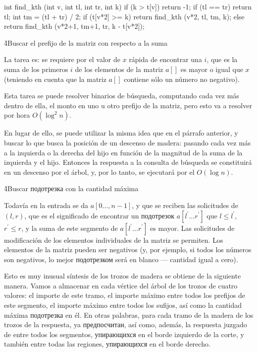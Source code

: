 \code
int find_kth (int v, int tl, int tr, int k) {
if (k > t[v])
return -1;
if (tl == tr)
return tl;
int tm = (tl + tr) / 2;
if (t[v*2] >= k)
return find_kth (v*2, tl, tm, k);
else
return find_kth (v*2+1, tm+1, tr, k - t[v*2]);
}
\endcode

\h4{Buscar el prefijo de la matriz con respecto a la suma}

La tarea es: se requiere por el valor de $x$ rápida de encontrar una $i$, que es la suma de los primeros $i$ de los elementos de la matriz $a[]$ es mayor o igual que $x$ (teniendo en cuenta que la matriz $a[]$ contiene sólo un número no negativo).

Esta tarea se puede resolver binarios de búsqueda, computando cada vez más dentro de ella, el monto en uno u otro prefijo de la matriz, pero esto va a resolver por hora $O (\log^2 n)$.

En lugar de ello, se puede utilizar la misma idea que en el párrafo anterior, y buscar lo que busca la posición de un descenso de madera: pasando cada vez más a la izquierda o la derecha del hijo en función de la magnitud de la suma de la izquierda y el hijo. Entonces la respuesta a la consulta de búsqueda se constituirá en un descenso por el árbol, y, por lo tanto, se ejecutará por el $O (\log n)$.

\h4{Buscar подотрезка con la cantidad máxima}

Todavía en la entrada se da $a[0 \ldots, n-1]$, y que se reciben las solicitudes de $(l,r)$, que es el significado de encontrar un подотрезок $a[l^\prime \ldots r^\prime]$ que $l \le l^\prime$, $r^\prime \le r$, y la suma de este segmento de $a[l^\prime \ldots r^\prime]$ es mayor. Las solicitudes de modificación de los elementos individuales de la matriz se permiten. Los elementos de la matriz pueden ser negativos (y, por ejemplo, si todos los números son negativos, lo mejor подотрезком será en blanco --- cantidad igual a cero).

Esto es muy inusual síntesis de los trozos de madera se obtiene de la siguiente manera. Vamos a almacenar en cada vértice del árbol de los trozos de cuatro valores: el importe de este tramo, el importe máximo entre todos los prefijos de este segmento, el importe máximo entre todos los sufijos, así como la cantidad máxima подотрезка en él. En otras palabras, para cada tramo de la madera de los trozos de la respuesta, ya предпосчитан, así como, además, la respuesta juzgado de entre todos los segmentos, упирающихся en el borde izquierdo de la corte, y también entre todas las regiones, упирающихся en el borde derecho.

